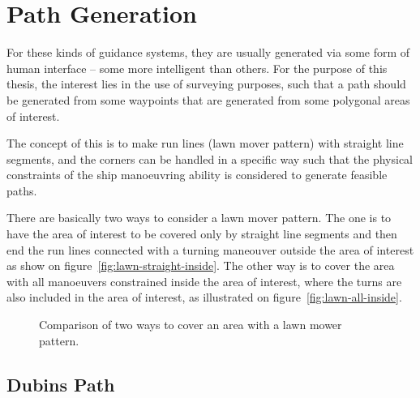 \chapter{Path Generation}
\label{ch:pathgen}

For these kinds of guidance systems, they are usually generated via some
form of human interface -- some more intelligent than others. For the
purpose of this thesis, the interest lies in the use of surveying
purposes, such that a path should be generated from some waypoints
that are generated from some polygonal areas of interest.

The concept of this is to make run lines (lawn mover pattern) with
straight line segments, and the corners can be handled in a specific
way such that the physical constraints of the ship manoeuvring ability
is considered to generate feasible paths.

There are basically two ways to consider a lawn mover pattern. The
one is to have the area of interest to be covered only by straight line
segments and then end the run lines connected with a turning maneouver outside the
area of interest as show on figure~\vref{fig:lawn-straight-inside}. The other way is to cover the area with all manoeuvers constrained inside the area of interest, where the turns are also included in the area of interest, as illustrated on figure~\vref{fig:lawn-all-inside}.

\begin{figure}[htbp]
	\centering
	\qquad
	\caption{Comparison of two ways to cover an area with a lawn mower
	pattern.}
\end{figure}

\section{Dubins Path}


